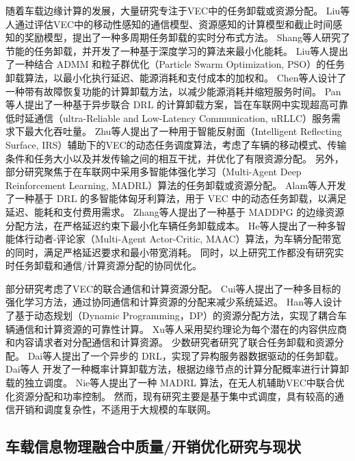 随着车载边缘计算的发展，大量研究专注于VEC中的任务卸载或资源分配。
Liu等人\cite{liu2021rtds}通过评估VEC中的移动性感知的通信模型、资源感知的计算模型和截止时间感知的奖励模型，提出了一种多周期任务卸载的实时分布式方法。
Shang等人\cite{shang2021deep}研究了节能的任务卸载，并开发了一种基于深度学习的算法来最小化能耗。
Liu等人\cite{liu2022a}提出了一种结合 ADMM 和粒子群优化（Particle Swarm Optimization, PSO）的任务卸载算法，以最小化执行延迟、能源消耗和支付成本的加权和。
Chen等人\cite{chen2020robust}设计了一种带有故障恢复功能的计算卸载方法，以减少能源消耗并缩短服务时间。
Pan等人\cite{pan2022asynchronous}提出了一种基于异步联合 DRL 的计算卸载方案，旨在车联网中实现超高可靠低时延通信（ultra-Reliable and Low-Latency Communication, uRLLC）服务需求下最大化吞吐量。
Zhu等人\cite{zhu2022a}提出了一种用于智能反射面（Intelligent Reflecting Surface, IRS）辅助下的VEC的动态任务调度算法，考虑了车辆的移动模式、传输条件和任务大小以及并发传输之间的相互干扰，并优化了有限资源分配。
另外，部分研究聚焦于在车联网中采用多智能体强化学习（Multi-Agent Deep Reinforcement Learning, MADRL）\cite{wu2020multi}算法的任务卸载或资源分配。
Alam等人\cite{alam2022multi}开发了一种基于 DRL 的多智能体匈牙利算法，用于 VEC 中的动态任务卸载，以满足延迟、能耗和支付费用需求。
Zhang等人\cite{zhang2021adaptive}提出了一种基于 MADDPG 的边缘资源分配方法，在严格延迟约束下最小化车辆任务卸载成本。
He等人\cite{he2021efficient}提出了一种多智能体行动者-评论家（Multi-Agent Actor-Critic, MAAC）算法，为车辆分配带宽的同时，满足严格延迟要求和最小带宽消耗。
同时，以上研究工作都没有研究实时任务卸载和通信/计算资源分配的协同优化。

部分研究考虑了VEC的联合通信和计算资源分配。
Cui等人\cite{cui2021reinforcement}提出了一种多目标的强化学习方法，通过协同通信和计算资源的分配来减少系统延迟。
Han等人\cite{han2020reliability}设计了基于动态规划（Dynamic Programming，DP）的资源分配方法，实现了耦合车辆通信和计算资源的可靠性计算。
Xu等人\cite{xu2021socially}采用契约理论为每个潜在的内容供应商和内容请求者对分配通信和计算资源。
少数研究者研究了联合任务卸载和资源分配。
Dai等人\cite{dai2021asynchronous}提出了一个异步的 DRL，实现了异构服务器数据驱动的任务卸载。
Dai等人 \cite{dai2022a}开发了一种概率计算卸载方法，根据边缘节点的计算分配概率进行计算卸载的独立调度。
Nie等人\cite{nie2021semi}提出了一种 MADRL 算法，在无人机辅助VEC中联合优化资源分配和功率控制。
然而，现有研究主要是基于集中式调度，具有较高的通信开销和调度复杂性，不适用于大规模的车联网。

\subsection{车载信息物理融合中质量/开销优化研究与现状}

